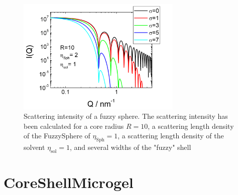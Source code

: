 \begin{figure}[htb]
\begin{center}
\includegraphics[width=0.7\textwidth,height=0.5\textwidth]{../images/form_factor/FuzzySphere/FuzzySphereIQ.png}
\end{center}
\caption{Scattering intensity of a fuzzy sphere. The scattering
intensity has been calculated for a core radius $R=10$, a
scattering length density of the FuzzySphere of
$\eta_\text{Sph}=1$, a scattering length density of the solvent
$\eta_\text{sol}=1$, and several widths of the "fuzzy" shell}
\label{fig:I_FuzzySphere}
\end{figure}


\clearpage
\section{CoreShellMicrogel}
\label{sect:CoreShellMicrogel} ~\\


